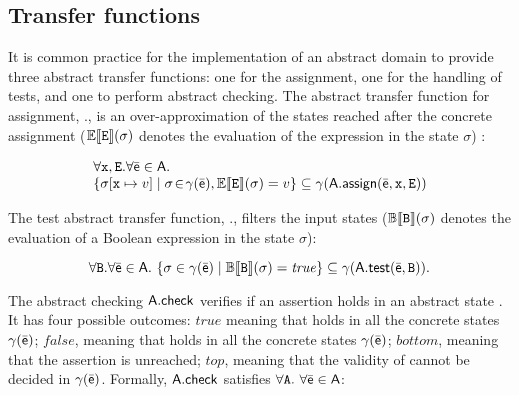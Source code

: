 \documentclass[sttt]{svjour}
\newcommand{\sopra}{}
\begin{document}
\subsection{Transfer functions}
 It is common practice for the implementation of an
 abstract domain  to provide three  abstract transfer functions:
 one for the assignment, one for the handling of
 tests, and one to perform abstract checking.  
 The abstract transfer function for assignment, .\aassign, is an
 over-approximation of the states reached after the concrete assignment ($\mathbb{E}\llbracket \mathtt{\mathtt{E}} \rrbracket(\sigma)$ denotes the evaluation of the expression  in the state $\sigma$) :
\begin{small}
  \[
  \begin{array}{l}
  \forall \mathtt{x}, \mathtt{E}. \forall \bar{\mathsf{\mathsf{e}}} \in \mathsf{A}. \\
  \{ \sigma[\mathtt{x} \mapsto v] \mid \sigma\! \in\! \gamma(\bar{\mathsf{\mathsf{e}}}), \mathbb{E}\llbracket \mathtt{\mathtt{E}} \rrbracket(\sigma) = v \} \subseteq \gamma(\mathsf{A}.\mathsf{\mathsf{assign}}(\bar{\mathsf{\mathsf{e}}}, \mathtt{x}, \mathtt{E}))
    \end{array}
  \]
\end{small}
The test abstract transfer function, .\atest, filters the input states ($\mathbb{B}\llbracket \mathtt{\mathtt{B}} \rrbracket(\sigma)$ denotes the evaluation of a Boolean  expression  in the state $\sigma$):
\begin{small}
\begin{equation*}
\forall \mathtt{B}. \forall \bar{\mathsf{\mathsf{e}}} \in  \mathsf{A}.\ \{ \sigma \in \gamma(\bar{\mathsf{\mathsf{e}}}) \mid \mathbb{B}\llbracket \mathtt{\mathtt{B}} \rrbracket(\sigma) = \mathit{true} \} \subseteq \gamma(\mathsf{A}.\mathsf{\mathsf{test}}(\bar{\mathsf{\mathsf{e}}}, \mathtt{B})).
\label{for:soundnesstest}
\end{equation*}
\end{small}
The abstract checking $\mathsf{A}.\mathsf{check}$ verifies if an assertion  holds in an abstract state .
It has four possible outcomes: $\mathit{true}$ meaning that  holds in all the concrete states $\gamma(\bar{\mathsf{\mathsf{e}}})$; $\mathit{false}$, meaning that  holds in all the concrete states $\gamma(\bar{\mathsf{\mathsf{e}}})$; $\mathit{bottom}$, meaning that the assertion is unreached; $\mathit{top}$, meaning that the validity of  cannot be decided in $\gamma(\bar{\mathsf{\mathsf{e}}})$.
Formally, ${\mathsf{A}}.\mathsf{check}$ satisfies $\forall \mathtt{A}.\ \forall
\bar{\mathsf{\mathsf{e}}} \in {\mathsf{A}}$:
\end{document}
